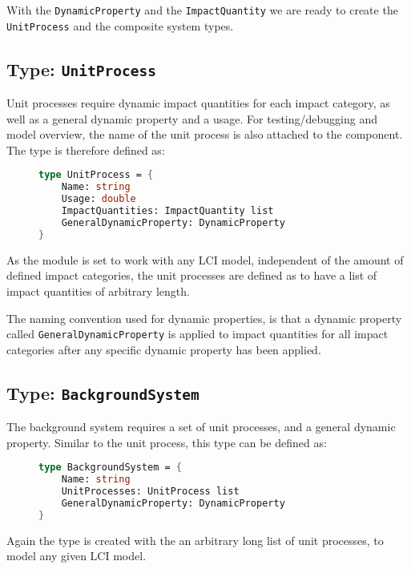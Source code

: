\vspace{1cm}
With the \texttt{DynamicProperty} and the \texttt{ImpactQuantity} we are ready to create the \texttt{UnitProcess} and the composite system types.

\subsection{Type: \texttt{UnitProcess}}
Unit processes require dynamic impact quantities for each impact category, as well as a general dynamic property and a usage. For testing/debugging and model overview, the name of the unit process is also attached to the component. The type is therefore defined as:

\begin{figure}[H]
\begin{lstlisting}[language=FSharp]
type UnitProcess = {
    Name: string
    Usage: double
    ImpactQuantities: ImpactQuantity list
    GeneralDynamicProperty: DynamicProperty
}
\end{lstlisting}
\end{figure}

As the module is set to work with any LCI model, independent of the amount of defined impact categories, the unit processes are defined as to have a list of impact quantities of arbitrary length. 

The naming convention used for dynamic properties, is that a dynamic property called \texttt{GeneralDynamicProperty} is applied to impact quantities for all impact categories after any specific dynamic property has been applied.

\subsection{Type: \texttt{BackgroundSystem}}
The background system requires a set of unit processes, and a general dynamic property. Similar to the unit process, this type can be defined as:

\begin{figure}[H]
\begin{lstlisting}[language=FSharp]
type BackgroundSystem = {
    Name: string
    UnitProcesses: UnitProcess list
    GeneralDynamicProperty: DynamicProperty
}
\end{lstlisting}
\end{figure}

Again the type is created with the an arbitrary long list of unit processes, to model any given LCI model.

